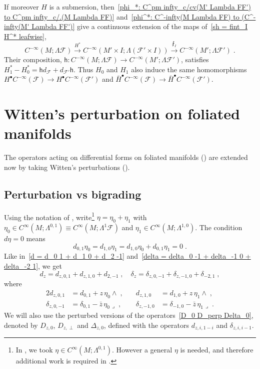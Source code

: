 \documentclass{memo-l}
\theoremstyle{plain}
\theoremstyle{definition}
\theoremstyle{remark}
\newcommand{\FF}{\mathcal{F}}
\newcommand{\sh}{\mathsf{h}}
\numberwithin{section}{chapter}
\numberwithin{equation}{section}%
\begin{document}
If moreover $H$ is a submersion, then~\eqref{phi_*: C^pm infty_c/cv(M' Lambda FF') to C^pm infty_c/.(M Lambda FF)} and~\eqref{phi^*: C^-infty(M Lambda FF) to (C^-infty(M' Lambda FF')} give a continuous extension of the maps of~\eqref{sh = fint_I H^* leafwise},
\[
C^{-\infty}(M;\Lambda\FF) \xrightarrow{H^*} C^{-\infty}(M'\times I;\Lambda(\FF'\times I))
\xrightarrow{\fint_I} C^{-\infty}(M';\Lambda\FF')\;.
\]
Their composition, $\sh:C^{-\infty}(M;\Lambda\FF)\to C^{-\infty}(M';\Lambda\FF')$, satisfies $H_1^*-H_0^*=\sh d_\FF+d_{\FF'}\sh$. Thus $H_0$ and $H_1$ also induce the same homomorphisms $H^\bullet C^{-\infty}(\FF)\to H^\bullet C^{-\infty}(\FF')$ and $\bar H^\bullet C^{-\infty}(\FF)\to\bar H^\bullet C^{-\infty}(\FF')$.


\section{Witten's perturbation on foliated manifolds}\label{s: Witten's perturbation on fold mfds}

The operators acting on differential forms on foliated manifolds () are extended now by taking Witten's perturbations ().

\subsection{Perturbation vs bigrading}\label{ss: perturbation vs bigrading}

Using the notation of , write\footnote{In \cite[Section~11]{AlvKordyLeichtnam2020}, we took $\eta\in C^\infty(M;\Lambda^{0,1})$. However a general $\eta$ is needed, and therefore additional work is required in .} $\eta=\eta_0+\eta_1$ with $\eta_0\in C^\infty(M;\Lambda^{0,1})\equiv C^\infty(M;\Lambda^1\FF)$ and $\eta_1\in C^\infty(M;\Lambda^{1,0})$. The condition $d\eta=0$ means
\begin{equation}\label{d_0 1 eta_0 = ... = 0}
d_{0,1}\eta_0=d_{1,0}\eta_1=d_{1,0}\eta_0+d_{0,1}\eta_1=0\;.
\end{equation}
Like in~\eqref{d = d_0 1 + d_1 0 + d_2 -1} and~\eqref{delta = delta_0 -1 + delta_-1 0 + delta_-2 1}, we get
\[
d_z=d_{z,0,1}+d_{z,1,0}+d_{2,-1}\;,\quad\delta_z=\delta_{z,0,-1}+\delta_{z,-1,0}+\delta_{-2,1}\;,
\]
where
\begin{alignat*}{2}
d_{z,0,1}&=d_{0,1}+z\,{\eta_0\wedge}\;,&\quad d_{z,1,0}&=d_{1,0}+z\,{\eta_1\wedge}\;,\\
\delta_{z,0,-1}&=\delta_{0,1}-\bar z\,{\eta_0\lrcorner}\;,&\quad\delta_{z,-1,0}&=\delta_{-1,0}-\bar z\,{\eta_1\lrcorner}\;.
\end{alignat*}
We will also use the perturbed versions of the operators~\eqref{D_0 D_perp Delta_0}, denoted by $D_{z,0}$, $D_{z,\perp}$ and $\Delta_{z,0}$, defined with the operators $d_{z,i,1-i}$ and $\delta_{z,i,i-1}$.     
\end{document}
